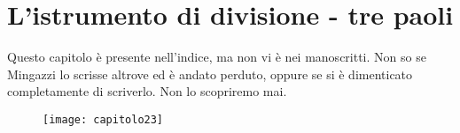 

\chapter{L'istrumento di divisione - tre paoli}

Questo capitolo è presente nell'indice, ma non vi è nei manoscritti. Non so se Mingazzi lo scrisse altrove ed è andato perduto, oppure se si è dimenticato completamente di scriverlo. Non lo scopriremo mai.

 \begin{figure}[htb]
    \centering
    \texttt{[image: capitolo23]}
\end{figure}
